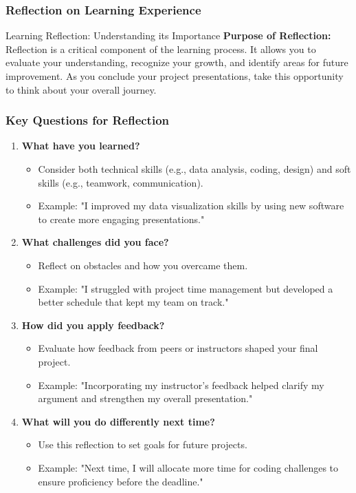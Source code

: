 \documentclass{beamer}
\begin{document}
\begin{frame}[fragile]
    \frametitle{Reflection on Learning Experience}
    \begin{block}{Learning Reflection: Understanding its Importance}
        \textbf{Purpose of Reflection:} Reflection is a critical component of the learning process. It allows you to evaluate your understanding, recognize your growth, and identify areas for future improvement. As you conclude your project presentations, take this opportunity to think about your overall journey.
    \end{block}
\end{frame}

\begin{frame}[fragile]
    \frametitle{Key Questions for Reflection}
    \begin{enumerate}
        \item \textbf{What have you learned?}
        \begin{itemize}
            \item Consider both technical skills (e.g., data analysis, coding, design) and soft skills (e.g., teamwork, communication).
            \item Example: "I improved my data visualization skills by using new software to create more engaging presentations."
        \end{itemize}
        
        \item \textbf{What challenges did you face?}
        \begin{itemize}
            \item Reflect on obstacles and how you overcame them.
            \item Example: "I struggled with project time management but developed a better schedule that kept my team on track."
        \end{itemize}

        \item \textbf{How did you apply feedback?}
        \begin{itemize}
            \item Evaluate how feedback from peers or instructors shaped your final project.
            \item Example: "Incorporating my instructor's feedback helped clarify my argument and strengthen my overall presentation."
        \end{itemize}

        \item \textbf{What will you do differently next time?}
        \begin{itemize}
            \item Use this reflection to set goals for future projects.
            \item Example: "Next time, I will allocate more time for coding challenges to ensure proficiency before the deadline."
        \end{itemize}
    \end{enumerate}
\end{frame}
\end{document}
